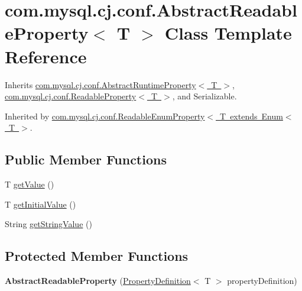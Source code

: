 \hypertarget{classcom_1_1mysql_1_1cj_1_1conf_1_1_abstract_readable_property}{}\section{com.\+mysql.\+cj.\+conf.\+Abstract\+Readable\+Property$<$ T $>$ Class Template Reference}
\label{classcom_1_1mysql_1_1cj_1_1conf_1_1_abstract_readable_property}


Inherits \mbox{\hyperlink{classcom_1_1mysql_1_1cj_1_1conf_1_1_abstract_runtime_property}{com.\+mysql.\+cj.\+conf.\+Abstract\+Runtime\+Property$<$ T $>$}}, \mbox{\hyperlink{interfacecom_1_1mysql_1_1cj_1_1conf_1_1_readable_property}{com.\+mysql.\+cj.\+conf.\+Readable\+Property$<$ T $>$}}, and Serializable.



Inherited by \mbox{\hyperlink{classcom_1_1mysql_1_1cj_1_1conf_1_1_readable_enum_property}{com.\+mysql.\+cj.\+conf.\+Readable\+Enum\+Property$<$ T extends Enum$<$ T $>$}}.

\subsection*{Public Member Functions}
\begin{DoxyCompactItemize}
\item 
T \mbox{\hyperlink{classcom_1_1mysql_1_1cj_1_1conf_1_1_abstract_readable_property_abb381de77253efc91da51b518f28ed42}{get\+Value}} ()
\item 
T \mbox{\hyperlink{classcom_1_1mysql_1_1cj_1_1conf_1_1_abstract_readable_property_a8848d72c6bd0795fe6585242d546f050}{get\+Initial\+Value}} ()
\item 
String \mbox{\hyperlink{classcom_1_1mysql_1_1cj_1_1conf_1_1_abstract_readable_property_a2a7a4ec0038e77928d07df31a52e3e8a}{get\+String\+Value}} ()
\end{DoxyCompactItemize}
\subsection*{Protected Member Functions}
\begin{DoxyCompactItemize}
\item 
\mbox{\label{classcom_1_1mysql_1_1cj_1_1conf_1_1_abstract_readable_property_aed2615bd01d5d87e9e8847a6b43ec815}} 
{\bfseries Abstract\+Readable\+Property} (\mbox{\hyperlink{interfacecom_1_1mysql_1_1cj_1_1conf_1_1_property_definition}{Property\+Definition}}$<$ T $>$ property\+Definition)
\end{DoxyCompactItemize}
